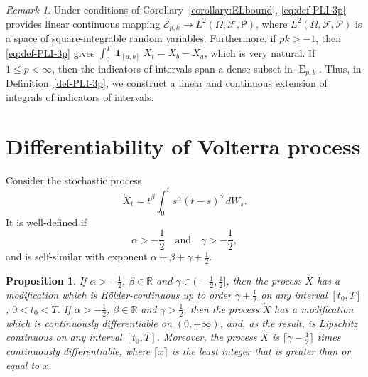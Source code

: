 \documentclass{article}
\DeclareMathOperator{\indicatorfun}{\mathbf{1}}
\newcommand{\dotX}{\dot{X}}
\theoremstyle{plain}
\newtheorem{prop}{Proposition}
\theoremstyle{remark}
\newtheorem{remark}{Remark}
\theoremstyle{definition}
\begin{document}
\begin{remark}\label{rem:just-def-PLI-3p}
 Under conditions of Corollary~\ref{corollary:ELbound},
\eqref{eq:def-PLI-3p} provides linear continuous
mapping $\mathcal{E}_{p,k} \to L^2(\Omega,\mathcal{F},\mathsf{P})$,
where $L^2(\Omega,\mathcal{F},\mathcal{P})$
is a space of square-integrable random variables.
Furthermore, if $p k\mathbin{>} {-}1$,
then \eqref{eq:def-PLI-3p}
gives $\int_0^T \indicatorfun_{[a,b]} X_t = X_b - X_a$,
which is very natural.
If $1\mathbin{\le}p\mathbin{<}\infty$,
then the indicators of intervals span a dense subset
in $\mathbin{E}_{p,k}$.
Thus, in Definition~\ref{def-PLI-3p},
we construct a linear and continuous extension
of integrals of indicators of intervals.
\end{remark}

\section{Differentiability of Volterra process}
Consider the stochastic process
\begin{equation}\label{eq:dotXdef}
\dotX _t = t^\beta \int_0^t s^\alpha (t-s)^\gamma \, dW_s .
\end{equation}
It is well-defined if
\[
\alpha>-\frac{1}{2} \quad \mbox{and}  \quad
\gamma>-\frac{1}{2},
\]
and
is self-similar with exponent $\alpha+\beta+\gamma+\frac12$.

\begin{prop}
If $\alpha>-\frac{1}{2}$, $\beta\in\mathbb{R}$
and $\gamma\in\bigl(-\frac12, \frac12\bigr]$,
then the process $\dotX$ has a modification
which is H\"older-continuous
up to order $\gamma+\frac12$ on any interval $[t_0, T]$,
$0<t_0<T$.
If $\alpha>-\frac{1}{2}$, $\beta\in\mathbb{R}$
and $\gamma>\frac12$, then the process
$\dotX$ has a modification
which is continuously differentiable on $(0,+\infty)$,
and, as the result, is Lipschitz continuous
on any interval $[t_0,T]$.
Moreover, the process $\dotX$ is $\lceil \gamma-\frac12 \rceil$
times continuously differentiable, where $\lceil x \rceil$
is the least integer that is greater than or equal to $x$.
\end{prop}
\end{document}
